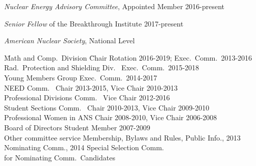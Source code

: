 \textit{Nuclear Energy Advisory Committee}, Appointed Member 2016-present

\textit{Senior Fellow} of the Breakthrough Institute 2017-present


\textit{American Nuclear Society}, National Level
\begin{tabbing}
\hspace*{2 em}\= Math and Comp.\ Division \hspace*{6em} \= Chair Rotation 2016-2019; Exec.\ Comm.\ 2013-2016 \\
%
\> Rad.\ Protection and Shielding Div.\ \> Exec.\ Comm.\ 2015-2018\\
%
\> Young Members Group \> Exec.\ Comm.\ 2014-2017\\
%
\> NEED Comm.\ \> Chair 2013-2015, Vice Chair 2010-2013\\
%
\> Professional Divisions Comm.\ \> Vice Chair 2012-2016 \\
%
\> Student Sections Comm.\ \> Chair 2010-2013, Vice Chair 2009-2010\\
%
\> Professional Women in ANS \> Chair 2008-2010, Vice Chair 2006-2008\\	
%
\> Board of Directors \> Student Member 2007-2009\\
%
\> Other committee service \>	Membership, Bylaws and Rules, Public Info., 2013 \\ \> \> Nominating Comm., 2014 Special Selection Comm.\ \\ \> \> for Nominating Comm.\ Candidates
\end{tabbing}

